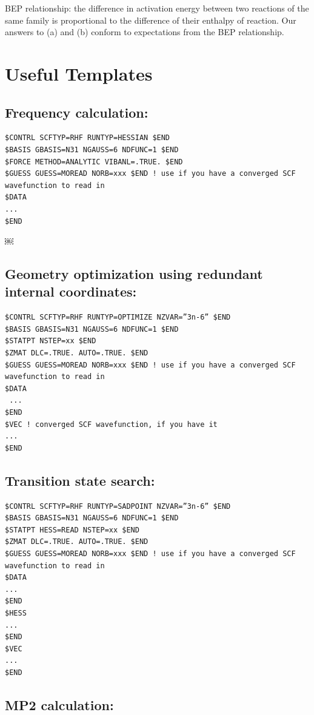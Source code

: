 \documentclass[11pt]{article}
\begin{document}
BEP relationship: the difference in activation energy between two reactions of the same family is proportional to the difference of their enthalpy of reaction.
Our answers to (a) and (b) conform to expectations from the BEP relationship.


\section{Useful Templates}
\label{sec:org1bd0899}

\subsection{Frequency calculation:}
\label{sec:orga69c24e}
\begin{verbatim}
$CONTRL SCFTYP=RHF RUNTYP=HESSIAN $END
$BASIS GBASIS=N31 NGAUSS=6 NDFUNC=1 $END
$FORCE METHOD=ANALYTIC VIBANL=.TRUE. $END
$GUESS GUESS=MOREAD NORB=xxx $END ! use if you have a converged SCF wavefunction to read in
$DATA
...
$END
\end{verbatim}

￼
\subsection{Geometry optimization using redundant internal coordinates:}
\label{sec:org377c58c}
\begin{verbatim}
$CONTRL SCFTYP=RHF RUNTYP=OPTIMIZE NZVAR=”3n-6” $END
$BASIS GBASIS=N31 NGAUSS=6 NDFUNC=1 $END
$STATPT NSTEP=xx $END
$ZMAT DLC=.TRUE. AUTO=.TRUE. $END
$GUESS GUESS=MOREAD NORB=xxx $END ! use if you have a converged SCF wavefunction to read in
$DATA
 ...
$END
$VEC ! converged SCF wavefunction, if you have it
...
$END
\end{verbatim}


\subsection{Transition state search:}
\label{sec:org691aa53}
\begin{verbatim}
$CONTRL SCFTYP=RHF RUNTYP=SADPOINT NZVAR=”3n-6” $END
$BASIS GBASIS=N31 NGAUSS=6 NDFUNC=1 $END
$STATPT HESS=READ NSTEP=xx $END
$ZMAT DLC=.TRUE. AUTO=.TRUE. $END
$GUESS GUESS=MOREAD NORB=xxx $END ! use if you have a converged SCF wavefunction to read in
$DATA
...
$END
$HESS
...
$END
$VEC
...
$END
\end{verbatim}


\subsection{MP2 calculation:}
\label{sec:org55cbd2d}
\end{document}
